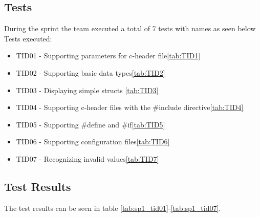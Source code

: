 \subsection{Tests}
During the sprint the team executed a total of 7 tests with names as seen below\\

\noindent Tests executed:

\begin{itemize}
\item TID01 - Supporting parameters for c-header file\autoref{tab:TID1}
\item TID02 - Supporting basic data types\autoref{tab:TID2}
\item TID03 -  Displaying simple structs \autoref{tab:TID3}
\item TID04 - Supporting c-header files with the \#include directive\autoref{tab:TID4}
\item TID05 - Supporting \#define and \#if\autoref{tab:TID5}
\item TID06 - Supporting configuration files\autoref{tab:TID6}
\item TID07 - Recognizing invalid values\autoref{tab:TID7}
\end{itemize}

\subsection{Test Results}
The test results can be seen in table \ref{tab:sp1_tid01}-\ref{tab:sp1_tid07}.
\begin{table}[!ht] \footnotesize \center
\caption{Supporting parameters for c-header file \label{tab:sp1_tid01}}
\noindent{}
\end{table}

\begin{table}[!ht] \footnotesize \center
\caption{Supporting basic data types \label{tab:sp1_tid02}}
\noindent{}
\end{table}

